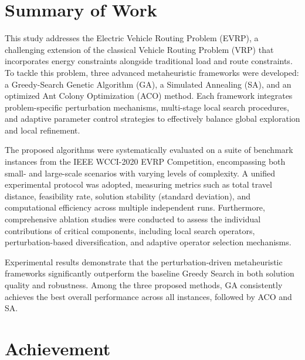 \section{Summary of Work}

This study addresses the Electric Vehicle Routing Problem (EVRP), a challenging extension of the classical Vehicle Routing Problem (VRP) that incorporates energy constraints alongside traditional load and route constraints.  
To tackle this problem, three advanced metaheuristic frameworks were developed: a Greedy-Search Genetic Algorithm (GA), a Simulated Annealing (SA), and an optimized Ant Colony Optimization (ACO) method.  
Each framework integrates problem-specific perturbation mechanisms, multi-stage local search procedures, and adaptive parameter control strategies to effectively balance global exploration and local refinement.

The proposed algorithms were systematically evaluated on a suite of benchmark instances from the IEEE WCCI-2020 EVRP Competition, encompassing both small- and large-scale scenarios with varying levels of complexity.  
A unified experimental protocol was adopted, measuring metrics such as total travel distance, feasibility rate, solution stability (standard deviation), and computational efficiency across multiple independent runs.  
Furthermore, comprehensive ablation studies were conducted to assess the individual contributions of critical components, including local search operators, perturbation-based diversification, and adaptive operator selection mechanisms.

Experimental results demonstrate that the perturbation-driven metaheuristic frameworks significantly outperform the baseline Greedy Search in both solution quality and robustness.  
Among the three proposed methods, GA consistently achieves the best overall performance across all instances, followed by ACO and SA.  


\section{Achievement}

